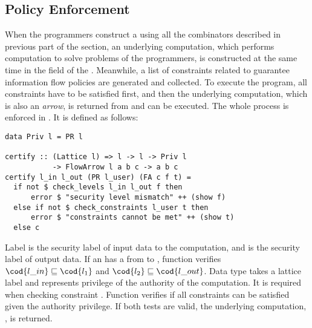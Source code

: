 \subsection{Policy Enforcement}
When the programmers construct a  using all the combinators 
described in previous part of the section, an underlying computation, which performs computation
to solve problems of the programmers, is constructed at the same time in the field   
of the . Meanwhile, a list of constraints related to 
guarantee information flow policies are generated and collected. To execute the program,
all constraints have to be satisfied first, and then the underlying computation, which is also 
an {\em arrow}, is returned from  and can be executed.
The whole process is enforced in . It is defined as follows:
\begin{verbatim}
data Priv l = PR l

certify :: (Lattice l) => l -> l -> Priv l 
           -> FlowArrow l a b c -> a b c
certify l_in l_out (PR l_user) (FA c f t) =
  if not $ check_levels l_in l_out f then
      error $ "security level mismatch" ++ (show f)
  else if not $ check_constraints l_user t then
      error $ "constraints cannot be met" ++ (show t)
  else c
\end{verbatim}
Label  is the security label of input data to the computation,
and  is the security label of output data. 
If an  has a  from  to , function  
verifies $\cod{l\_in} \sqsubseteq \cod{l_1}$ and $\cod{l_2} \sqsubseteq \cod{l\_out}$.
Data type  takes a lattice label and represents privilege of the authority of the
computation. It is required when checking constraint .
Function  verifies if all constraints can be satisfied given the authority
privilege. If both tests are valid, the underlying computation, , is returned.

